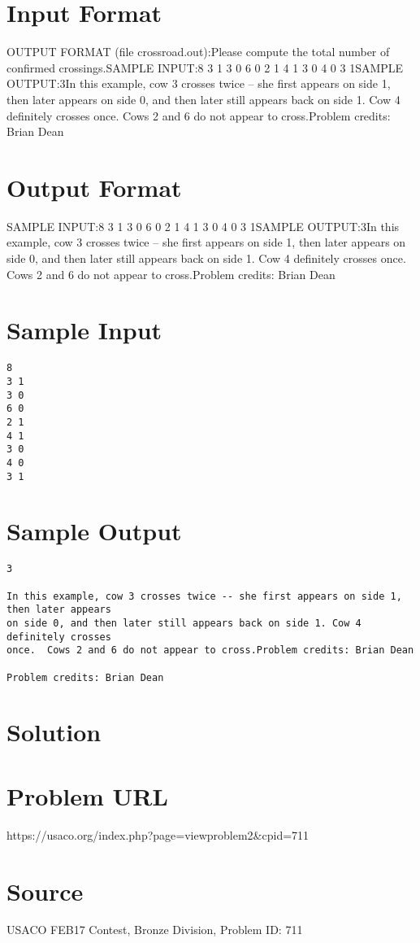 \documentclass[12pt]{article}
\begin{document}
\section*{Input Format}
OUTPUT FORMAT (file crossroad.out):Please compute the total number of confirmed crossings.SAMPLE INPUT:8
3 1
3 0
6 0
2 1
4 1
3 0
4 0
3 1SAMPLE OUTPUT:3In this example, cow 3 crosses twice -- she first appears on side 1, then later appears
on side 0, and then later still appears back on side 1. Cow 4 definitely crosses
once.  Cows 2 and 6 do not appear to cross.Problem credits: Brian Dean

\section*{Output Format}
SAMPLE INPUT:8
3 1
3 0
6 0
2 1
4 1
3 0
4 0
3 1SAMPLE OUTPUT:3In this example, cow 3 crosses twice -- she first appears on side 1, then later appears
on side 0, and then later still appears back on side 1. Cow 4 definitely crosses
once.  Cows 2 and 6 do not appear to cross.Problem credits: Brian Dean

\section*{Sample Input}
\begin{verbatim}
8
3 1
3 0
6 0
2 1
4 1
3 0
4 0
3 1
\end{verbatim}

\section*{Sample Output}
\begin{verbatim}
3

In this example, cow 3 crosses twice -- she first appears on side 1, then later appears
on side 0, and then later still appears back on side 1. Cow 4 definitely crosses
once.  Cows 2 and 6 do not appear to cross.Problem credits: Brian Dean

Problem credits: Brian Dean
\end{verbatim}

\section*{Solution}


\section*{Problem URL}
https://usaco.org/index.php?page=viewproblem2&cpid=711

\section*{Source}
USACO FEB17 Contest, Bronze Division, Problem ID: 711
\end{document}

